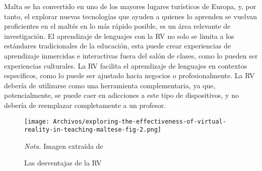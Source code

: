 Malta se ha convertido en uno de los mayores lugares turísticos de Europa, y, por tanto, el explorar nuevas tecnologías que ayuden a quienes lo aprenden se vuelvan proficientes en el maltés en lo más rápido posible, es un área relevante de investigación. El aprendizaje de lenguajes con la RV no solo se limita a los estándares tradicionales de la educación, esta puede crear experiencias de aprendizaje inmercidas e interactivas fuera del salón de clases, como lo pueden ser experiencias culturales. La RV facilita el aprendizaje de lenguajes en contextos específicos, como lo puede ser ajustado hacia negocios o profesionalmente. La RV debería de utilizarse como una herramienta complementaria, ya que, potencialmente, se puede caer en adicciones a este tipo de dispositivos, y no debería de reemplazar completamente a un profesor. \cite{ZAMMIT2023100035}

\begin{figure}[H]
   \begin{center}
      \texttt{[image: Archivos/exploring-the-effectiveness-of-virtual-reality-in-teaching-maltese-fig-2.png]}
   \end{center}
   \caption{Las desventajas de la RV}
   \label{fig:disvr}
   \textit{Nota. }Imagen extraída de \cite{ZAMMIT2023100035}
\end{figure}

